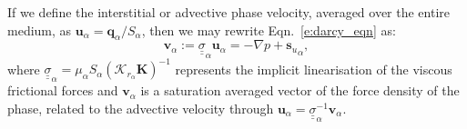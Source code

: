 \documentclass[preprint,authoryear,12pt]{elsarticle}
\begin{document}
If we define the interstitial or advective phase velocity, averaged over the entire medium, as $\mathbf{u}_\alpha= \mathbf{q}_\alpha/S_\alpha$, then we may rewrite Eqn.~\ref{e:darcy_eqn} as:
\begin{equation}
  \mathbf{v}_{\alpha}:= {\underline {\underline \sigma}}_{\alpha} \mathbf{u}_{\alpha} = - \nabla p + {\mathbf{s}_{u}}_{\alpha},
  \label{force-bal}
\end{equation}
where ${\underline {\underline \sigma}}_{\alpha}=\mu_\alpha S_\alpha \left(\mathcal{K}_{{r}_\alpha}\mathbf{K}\right)^{-1}$ represents the implicit linearisation of the viscous frictional forces and $\mathbf{v}_\alpha$ is a saturation averaged vector of the force density of the phase, related to the advective velocity through $\mathbf{u}_\alpha={\underline {\underline \sigma}}_{\alpha}^{-1}\mathbf{v}_\alpha$.%
\end{document}
